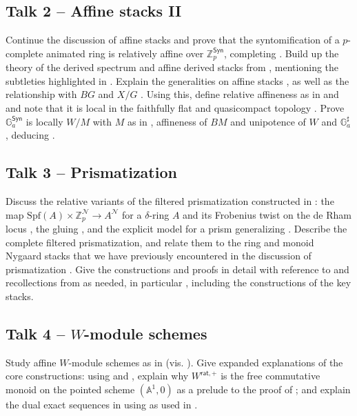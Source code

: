 \documentclass[12pt]{amsart}
\theoremstyle{definition}
\begin{document}
\subsection*{Talk 2 -- Affine stacks II}
Continue the discussion of affine stacks and prove that the syntomification of a $p$-complete animated ring is relatively affine over $\mathbb{Z}_{p}^{\mathsf{Syn}}$, completing \cite[App. B]{LM25}. Build up the theory of the derived spectrum and affine derived stacks from \cite[\S 3]{MM}, mentioning the subtleties highlighted in \cite[Cor. 3.12 \& Rmk. 3.13]{MM}. Explain the generalities on affine stacks \cite[Prop. 4.1 \& 4.2]{MM}, as well as the relationship with $BG$ and $X/G$ \cite[Cor. 4.4 \& Prop. 4.11]{MM}. Using this, define relative affineness as in \cite[Def. B.7]{LM25} and \cite[Rmk. 4.5]{MM} and note that it is local in the faithfully flat and quasicompact topology \cite[Rmk. B.8]{LM25}. Prove $\mathbb{G}_{a}^{\mathsf{Syn}}$ is locally $W/M$ with $M$ as in \cite[Ex. 5.5.6]{Bha22}, affineness of $BM$ \cite[Prop. 4.11]{MM} and unipotence of $W$ and $\mathbb{G}_{a}^{\sharp}$, deducing \cite[Thm. B.9]{LM25}. 

\newpage
\subsection*{Talk 3 -- Prismatization} 
Discuss the relative variants of the filtered prismatization constructed in \cite[\S 1.1]{LM25}: the map $\mathrm{Spf}(A)\times\mathbb{Z}_{p}^{\mathcal{N}}\to A^{\mathcal{N}}$ for a $\delta$-ring $A$ and its Frobenius twist on the de Rham locus \cite[Rec. 1.1.1 \& Rmk. 1.1.2]{LM25}, the gluing \cite[Const. 1.1.4]{LM25}, and the explicit model for a prism \cite[Const. 1.1.6]{LM25} generalizing \cite[Ex. 5.5.6]{Bha22}. Describe the complete filtered prismatization, and relate them to the ring and monoid Nygaard stacks that we have previously encountered in the discussion of prismatization \cite[Rmk. 1.1.3]{LM25}. Give the constructions and proofs in detail with reference to and recollections from \cite{Bha22} as needed, in particular \cite[\S 5]{Bha22}, including the constructions of the key stacks.
\subsection*{Talk 4 -- $W$-module schemes} 
Study affine $W$-module schemes as in \cite[\S 1.2]{LM25} (vis. \cite[\S 2.6 \& 5.2]{Bha22}). Give expanded explanations of the core constructions: using \cite[A.4]{Mat23} and \cite[Rmk. A.17]{LM25}, explain why $W^{\mathsf{rat}, +}$ is the free commutative monoid on the pointed scheme $(\mathbb{A}^1, 0)$ as a prelude to the proof of \cite[Lem. 1.2.4]{LM25}; and explain the dual exact sequences in \cite[Rec. 1.2.12]{LM25} using \cite[\S 3.7-8]{Dri22} as used in \cite[Cor. 1.2.13]{LM25}.  
\end{document}
